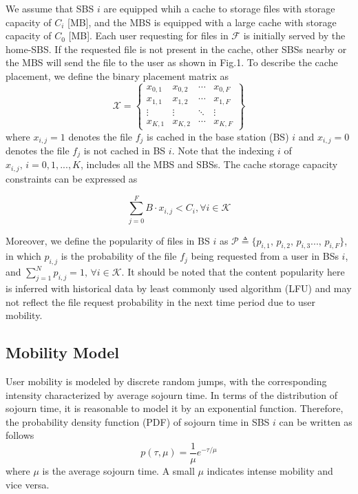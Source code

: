 \documentclass[conference]{IEEEtran}
\begin{document}
We assume that SBS $i$ are equipped whih a cache to storage files with storage capacity of $C_i$ [MB], and the MBS is equipped with a large cache with storage capacity of $C_0$ [MB]. Each user requesting for files in $\mathcal{F}$ is initially served by the home-SBS. If the requested file is not present in the cache, other SBSs nearby or the MBS will send the file to the user as shown in Fig.1. To describe the cache placement, we define the binary placement matrix as
$$\mathcal{X}=
\begin{Bmatrix}
x_{0,1}    &x_{0,2}  & \cdots & x_{0,F} \\
x_{1,1}    &x_{1,2}  & \cdots & x_{1,F} \\
\vdots    &\vdots  & \ddots &\vdots \\
x_{K,1}    &x_{K,2}  & \cdots & x_{K,F}
\end{Bmatrix}
$$
where $x_{i,j}=1$ denotes the file $f_j$ is cached in the base station (BS) $i$ and $x_{i,j}=0$ denotes the file $f_j$ is not cached in BS $i$. Note that the indexing $i$ of $x_{i,j}\mathrm{,\,} i=0,1,...,K$, includes all the MBS and SBSs. The cache storage capacity constraints can be expressed as

\begin{equation}
\sum_{j=0}^F B\cdot x_{i,j}<C_i,\forall{i}\in\mathcal{K}
\end{equation}

Moreover, we define the popularity of files in BS $i$ as $\mathcal{P} \triangleq\{p_{i,1}\mathrm{,\,}p_{i,2}\mathrm{,\,}p_{i,3}...\mathrm{,\,}p_{i,F}\}$, in which $p_{i,j}$ is the probability of the file $f_j$ being requested from a user in BSs $i$, and $ \sum_{j=1}^N p_{i,j}=1,\,\forall{i}\in\mathcal{K}$. It should be noted that the content popularity here is inferred with historical data by least commonly used algorithm (LFU) and may not reflect the file request probability in the next time period due to user mobility.

\subsection{Mobility Model}
User mobility is modeled by discrete random jumps, with the corresponding intensity characterized by average sojourn time. In terms of the distribution of sojourn time, it is reasonable to model it by an exponential function\cite{8013789}. Therefore, the probability density function (PDF) of sojourn time in SBS $i$ can be written as follows
\begin{equation}
p(\tau,\mu)=\frac{1}{\mu}e^{-\tau/\mu}
\end{equation}
where $\mu$ is the average sojourn time. A small $\mu$ indicates intense mobility and vice versa.
\end{document}
